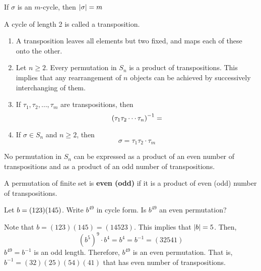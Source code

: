 \begin{remark}
    If $\sigma$ is an $m$-cycle, then $\qty|\sigma| = m$
\end{remark}

\begin{definition}
    A cycle of length 2 is called a transposition.
\end{definition}

\begin{remark} \phantom{blank}
    \begin{enumerate}
        \item A transposition leaves all elements but two fixed, and maps each of these onto the other.
        \item Let $n \geq 2$. Every permutation in $S_n$ is a product of transpositions. This implies that any rearrangement of $n$ objects can be achieved by successively interchanging of them.
        \item If $\tau_1, \tau_2, \ldots, \tau_m$ are transpositions, then 
        \[ \qty(\tau_1 \tau_2 \cdots \tau_n)^{-1} =  \]
        \item If $\sigma \in S_n$ and $n \geq 2$, then
        \[ \sigma = \tau_1 \tau_2 \cdot \tau_m  \]
    \end{enumerate}
\end{remark}

\begin{theorem}
    No permutation in $S_n$ can be expressed as a product of an even number of transpositions and as a product of an odd number of transpositions.
\end{theorem}

\begin{definition}
    A permutation of finite set is \textbf{even (odd)} if it is a product of even (odd) number of transpositions.
\end{definition}

\begin{exercise}
    Let $b = \qty(123)\qty(145)$. Write $b^{49}$ in cycle form. Is $b^{49}$ an even permutation?
\end{exercise}

\begin{solution}
    Note that $b = (123)(145) = (14523)$. This implies that $\qty|b| = 5$. Then,
    \[ (b^5)^9 \cdot b^4 = b^4 = b^{-1} = (32541)   \]
    $b^{49} = b^{-1}$ is an odd length. Therefore, $b^{49}$ is an even permutation. That is, $b^{-1} = (32)(25)(54)(41)$ that has even number of transpositions.
\end{solution}

